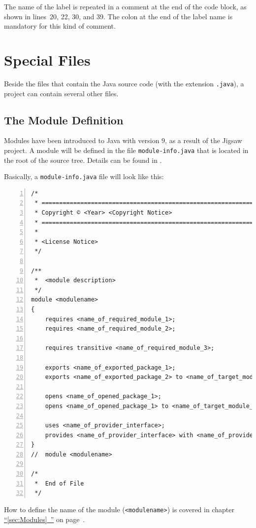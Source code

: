 \documentclass[11pt,a4paper, titlepage, parskip=half, headsepline, footsepline, cleardoublepage=current, headheight=1cm]{scrbook}
\newcommand*{\tqfullvref}[1]{\hyperref[{#1}]{“\ref*{#1}~\nameref*{#1}”} on page~\pageref{#1}}
\begin{document}
The name of the label is repeated in a comment at the end of the code block, as shown in lines~20, 22, 30, and 39. The colon at the end of the label name is mandatory for this kind of comment.

\section{Special Files}
Beside the files that contain the Java source code (with the extension \verb#.java#), a project can contain several other files.

\subsection{The Module Definition}\label{sec:ModuleDefinition}
Modules have been introduced to Java with version 9, as a result of the Jigsaw project. A module will be defined in the file \verb#module-info.java# that is located in the root of the source tree. Details can be found in \autocite{ORACLE_DOC_LANGUAGE_SPECIFICATION:ModuleDeclarations}.

Basically, a \verb#module-info.java# file will look like this:
\begin{lstlisting}[numbers=left, caption={module-info.java},morekeywords={exports,module,opens,provides,requires,to,transitive,uses,var,with,yield}]
/*
 * ==================================================================
 * Copyright © <Year> <Copyright Notice>
 * ==================================================================
 *
 * <License Notice>
 */
 
/**
 *  <module description>
 */ 
module <modulename> 
{
    requires <name_of_required_module_1>;
    requires <name_of_required_module_2>;

    requires transitive <name_of_required_module_3>;

    exports <name_of_exported_package_1>;
    exports <name_of_exported_package_2> to <name_of_target_module_1>;

    opens <name_of_opened_package_1>;
    opens <name_of_opened_package_1> to <name_of_target_module_1>, <name_of_target_module_2>;

    uses <name_of_provider_interface>;
    provides <name_of_provider_interface> with <name_of_provider_implementation>;
}
//  module <modulename>

/*
 *  End of File
 */
\end{lstlisting}
How to define the name of the module (\lstinline|<modulename>|) is covered in chapter \tqfullvref{sec:Modules}.
\end{document}
